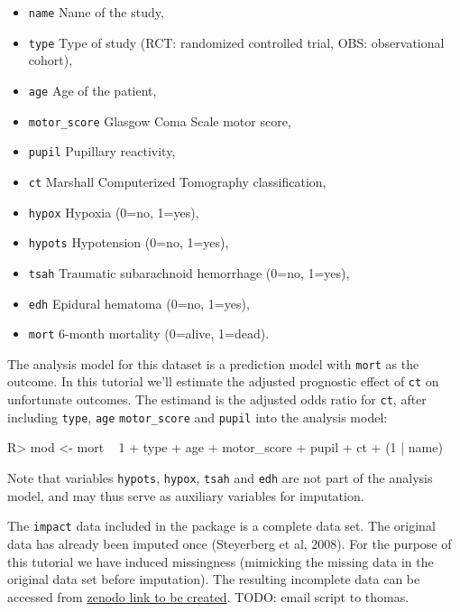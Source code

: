 \documentclass[
]{jss}
\providecommand{\tightlist}{%
  \setlength{\itemsep}{0pt}\setlength{\parskip}{0pt}}
\begin{document}
\begin{itemize}
\tightlist
\item
  \texttt{name} Name of the study,
\item
  \texttt{type} Type of study (RCT: randomized controlled trial, OBS:
  observational cohort),
\item
  \texttt{age} Age of the patient,
\item
  \texttt{motor\_score} Glasgow Coma Scale motor score,
\item
  \texttt{pupil} Pupillary reactivity,
\item
  \texttt{ct} Marshall Computerized Tomography classification,
\item
  \texttt{hypox} Hypoxia (0=no, 1=yes),
\item
  \texttt{hypots} Hypotension (0=no, 1=yes),
\item
  \texttt{tsah} Traumatic subarachnoid hemorrhage (0=no, 1=yes),
\item
  \texttt{edh} Epidural hematoma (0=no, 1=yes),
\item
  \texttt{mort} 6-month mortality (0=alive, 1=dead).
\end{itemize}

The analysis model for this dataset is a prediction model with
\texttt{mort} as the outcome. In this tutorial we'll estimate the
adjusted prognostic effect of \texttt{ct} on unfortunate outcomes. The
estimand is the adjusted odds ratio for \texttt{ct}, after including
\texttt{type}, \texttt{age} \texttt{motor\_score} and \texttt{pupil}
into the analysis model:

\begin{CodeChunk}
\begin{CodeInput}
R> mod <- mort ~ 1 + type + age + motor_score + pupil + ct + (1 | name) 
\end{CodeInput}
\end{CodeChunk}

Note that variables \texttt{hypots}, \texttt{hypox}, \texttt{tsah} and
\texttt{edh} are not part of the analysis model, and may thus serve as
auxiliary variables for imputation.

The \texttt{impact} data included in the  package is a
complete data set. The original data has already been imputed once
(Steyerberg et al, 2008). For the purpose of this tutorial we have
induced missingness (mimicking the missing data in the original data set
before imputation). The resulting incomplete data can be accessed from
\href{https://zenodo.com}{zenodo link to be created}. TODO: email script
to thomas.
\end{document}
